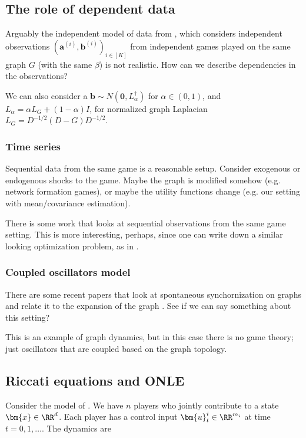 \subsection{The role of dependent data} 


Arguably the independent model of data from \cite{leng2020learning}, which considers independent observations $(\bm{a}^{(i)}, \bm{b}^{(i)})_{i \in [K]}$ from independent games played on the same graph $G$ (with the same $\beta$) is not realistic. How can we describe dependencies in the observations? 

We can also consider a $\bm{b} \sim N(\bm{0}, L_\alpha^\dagger)$ for $\alpha \in (0, 1)$, and $L_\alpha = \alpha L_G + (1 - \alpha) I$, for normalized graph Laplacian $L_G = D^{-1/2} (D - G) D^{-1/2}$. 


\subsubsection{Time series}

Sequential data from the same game is a reasonable setup. Consider exogenous or endogenous shocks to the game. Maybe the graph is modified somehow (e.g. network formation games), or maybe the utility functions change (e.g. our setting with mean/covariance estimation). 

There is some work that looks at sequential observations from the same game setting. This is more interesting, perhaps, since one can write down a similar looking optimization problem, as in \cite{peters2021inferring}. 



\subsubsection{Coupled oscillators model} 

There are some recent papers that look at spontaneous synchornization on graphs and relate it to the expansion of the graph \cite{abdalla2022expander}. See if we can say something about this setting? 

This is an example of graph dynamics, but in this case there is no game theory; just oscillators that are coupled based on the graph topology. 

\subsection{Riccati equations and ONLE}

Consider the model of \cite{peters2021inferring}. We have $n$ players who jointly contribute to a state $\bm{x} \in \RR^d$. Each player has a control input $\bm{u}_t^i \in \RR^{m_i}$ at time $t = 0, 1, \dots$. The dynamics are 

